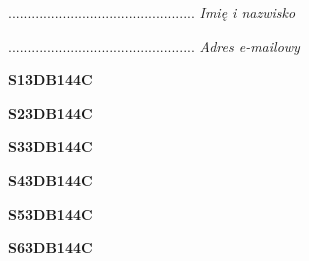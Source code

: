 \begin{turn}{90}\begin{minipage}{\linewidth} \vspace{20mm} ................................................  \textit{Imię i nazwisko}\end{minipage}\end{turn}

\begin{turn}{90}\begin{minipage}{\linewidth} \vspace{20mm} ................................................  \textit{Adres e-mailowy}\end{minipage}\end{turn}

\begin{turn}{90}\huge \begin{minipage}{\linewidth} \vspace{10mm}\textbf{S13DB144C}\end{minipage}\end{turn}

\begin{turn}{90}\huge \begin{minipage}{\linewidth} \vspace{10mm}\textbf{S23DB144C}\end{minipage}\end{turn}

\begin{turn}{90}\huge \begin{minipage}{\linewidth} \vspace{10mm}\textbf{S33DB144C}\end{minipage}\end{turn}

\begin{turn}{90}\huge \begin{minipage}{\linewidth} \vspace{10mm}\textbf{S43DB144C}\end{minipage}\end{turn}

\begin{turn}{90}\huge \begin{minipage}{\linewidth} \vspace{10mm}\textbf{S53DB144C}\end{minipage}\end{turn}

\begin{turn}{90}\huge \begin{minipage}{\linewidth} \vspace{10mm}\textbf{S63DB144C}\end{minipage}\end{turn}